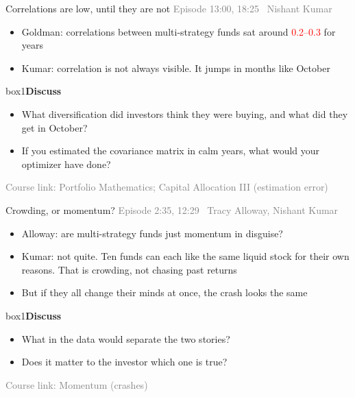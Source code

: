 \documentclass[aspectratio=169,10pt]{beamer}
\newcommand{\src}[1]{{\footnotesize\textcolor{gray}{Episode #1}}\par\vskip 6pt}
\newcommand{\course}[1]{{\footnotesize\textcolor{gray}{Course link: #1}}}
\newenvironment{discuss}{\begin{beamercolorbox}[rounded=true,sep=8pt]{box1}\textbf{Discuss}\par\vskip 3pt}{\end{beamercolorbox}}
\begin{document}
\begin{frame}[label=q4]{Correlations are low, until they are not}
\src{13:00, 18:25 \textbullet\ Nishant Kumar}
\begin{itemize}
\item Goldman: correlations between multi-strategy funds sat around \textcolor{red}{0.2--0.3} for years
\vskip 6pt
\item Kumar: correlation is not always visible. It jumps in months like October
\end{itemize}
\vskip 12pt
\begin{discuss}
\begin{itemize}
\item What diversification did investors think they were buying, and what did they get in October?
\item If you estimated the covariance matrix in calm years, what would your optimizer have done?
\end{itemize}
\end{discuss}
\vfill
\course{Portfolio Mathematics; Capital Allocation III (estimation error)} \hfill \hyperlink{appendix_div}{}
\end{frame}

\begin{frame}[label=q5]{Crowding, or momentum?}
\src{2:35, 12:29 \textbullet\ Tracy Alloway, Nishant Kumar}
\begin{itemize}
\item Alloway: are multi-strategy funds just momentum in disguise?
\vskip 6pt
\item Kumar: not quite. Ten funds can each like the same liquid stock for their own reasons. That is crowding, not chasing past returns
\vskip 6pt
\item But if they all change their minds at once, the crash looks the same
\end{itemize}
\vskip 10pt
\begin{discuss}
\begin{itemize}
\item What in the data would separate the two stories?
\item Does it matter to the investor which one is true?
\end{itemize}
\end{discuss}
\vfill
\course{Momentum (crashes)}
\end{frame}
\end{document}
